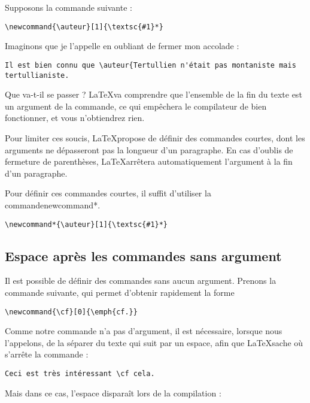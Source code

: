 Supposons la commande suivante :

\begin{verbatim}
\newcommand{\auteur}[1]{\textsc{#1}*}
\end{verbatim}

Imaginons que je l'appelle en oubliant de fermer mon accolade :

\begin{verbatim}
Il est bien connu que \auteur{Tertullien n'était pas montaniste mais tertullianiste.
\end{verbatim}

Que va-t-il se passer ? \LaTeX va comprendre que l'ensemble de la fin du texte est un argument de la commande, ce qui empêchera le compilateur de bien fonctionner, et vous n'obtiendrez rien.

Pour limiter ces soucis, \LaTeX propose de définir des commandes courtes, dont les arguments ne dépasseront pas la longueur d'un paragraphe. En cas d'oublis de fermeture de parenthèses, \LaTeX arrêtera automatiquement l'argument à la fin d'un paragraphe.

Pour définir ces commandes courtes, il suffit d'utiliser la commande{newcommand*}.

\begin{verbatim}
\newcommand*{\auteur}[1]{\textsc{#1}*}
\end{verbatim}

\subsection{Espace après les commandes sans argument}


Il est possible de définir des commandes sans aucun argument. Prenons la commande suivante, qui permet d'obtenir rapidement la forme \forme{\cf}

\begin{verbatim}
\newcommand{\cf}[0]{\emph{cf.}}
\end{verbatim}

Comme notre commande n'a pas d'argument, il est nécessaire, lorsque nous l'appelons, de la séparer du texte qui suit par un espace, afin que \LaTeX sache où s'arrête la commande : 

\begin{verbatim}
Ceci est très intéressant \cf cela.
\end{verbatim}

Mais dans ce cas, l'espace disparaît lors de la compilation :

